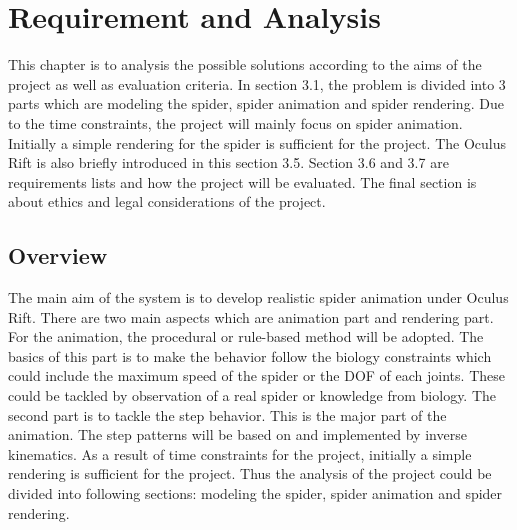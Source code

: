 \chapter{Requirement and Analysis}
This chapter is to analysis the possible solutions according to the aims of the project as well as evaluation criteria. In section 3.1, the problem is divided into 3 parts which are modeling the spider, spider animation and spider rendering. Due to the time constraints, the project will mainly focus on spider animation. Initially a simple rendering for the spider is sufficient for the project. The Oculus Rift is also briefly introduced in this section 3.5. Section 3.6 and 3.7 are requirements lists and how the project will be evaluated. The final section is about ethics and legal considerations of the project.
\section{Overview}
The main aim of the system is to develop realistic spider animation under Oculus Rift. There are two main aspects which are animation part and rendering part. For the animation, the procedural or rule-based method will be adopted. The basics of this part is to make the behavior follow the biology constraints which could include the maximum speed of the spider or the DOF of each joints. These could be tackled by observation of a real spider or knowledge from biology. The second part is to tackle the step behavior. This is the major part of the animation. The step patterns will be based on \cite{arsimu2} and implemented by inverse kinematics\cite{alan3D}. As a result of time constraints for the project, initially a simple rendering is sufficient for the project. Thus the analysis of the project could be divided into following sections: modeling the spider, spider animation and spider rendering.
